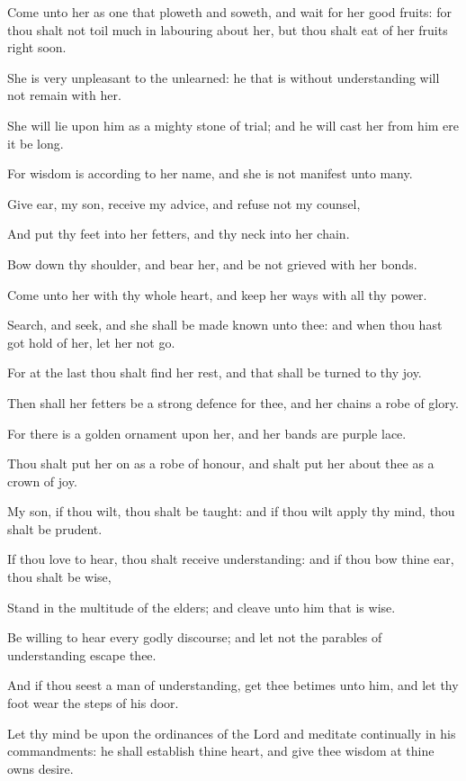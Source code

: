 {\par }{\PP {}Come unto her as one that ploweth and soweth, and wait for her good fruits: for thou shalt not toil much in labouring about her, but thou shalt eat of her fruits right soon.
\par }{\PP {}She is very unpleasant to the unlearned: he that is without understanding will not remain with her.
\par }{\PP {}She will lie upon him as a mighty stone of trial; and he will cast her from him ere it be long.
\par }{\PP {}For wisdom is according to her name, and she is not manifest unto many.
\par }{\PP {}Give ear, my son, receive my advice, and refuse not my counsel,
\par }{\PP {}And put thy feet into her fetters, and thy neck into her chain.
\par }{\PP {}Bow down thy shoulder, and bear her, and be not grieved with her bonds.
\par }{\PP {}Come unto her with thy whole heart, and keep her ways with all thy power.
\par }{\PP {}Search, and seek, and she shall be made known unto thee: and when thou hast got hold of her, let her not go.
\par }{\PP {}For at the last thou shalt find her rest, and that shall be turned to thy joy.
\par }{\PP {}Then shall her fetters be a strong defence for thee, and her chains a robe of glory.
\par }{\PP {}For there is a golden ornament upon her, and her bands are purple lace.
\par }{\PP {}Thou shalt put her on as a robe of honour, and shalt put her about thee as a crown of joy.
\par }{\PP {}My son, if thou wilt, thou shalt be taught: and if thou wilt apply thy mind, thou shalt be prudent.
\par }{\PP {}If thou love to hear, thou shalt receive understanding: and if thou bow thine ear, thou shalt be wise,
\par }{\PP {}Stand in the multitude of the elders; and cleave unto him that is wise.
\par }{\PP {}Be willing to hear every godly discourse; and let not the parables of understanding escape thee.
\par }{\PP {}And if thou seest a man of understanding, get thee betimes unto him, and let thy foot wear the steps of his door.
\par }{\PP {}Let thy mind be upon the ordinances of the Lord and meditate continually in his commandments: he shall establish thine heart, and give thee wisdom at thine owns desire.

}
